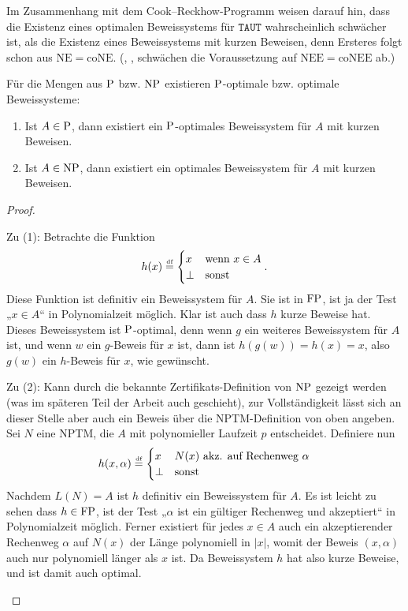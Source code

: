 Im Zusammenhang mit dem Cook–Reckhow-Programm weisen \textcite{krajicek_propositional_1989} darauf hin, dass die Existenz eines optimalen Beweissystems für $\mathtt{TAUT}$ wahrscheinlich schwächer ist, als die Existenz eines Beweissystems mit kurzen Beweisen, denn Ersteres folgt schon aus $\mathrm{NE}=\mathrm{coNE}$. (\citeauthor{kobler_optimal_2003}, \citeyear{kobler_optimal_2003}, schwächen die Voraussetzung auf $\mathrm{NEE=coNEE}$ ab.)

Für die Mengen aus $\P$ bzw. $\NP$ existieren $\P$-optimale bzw. optimale Beweissysteme:
\begin{observation}\label{obs:np-short-ps}
    \begin{enumerate}
        \item Ist $A\in \P$, dann existiert ein $\P$-optimales Beweissystem für $A$ mit kurzen Beweisen.
        \item Ist $A\in \NP$, dann existiert ein optimales Beweissystem für $A$ mit kurzen Beweisen.
    \end{enumerate}
\end{observation}
\begin{proof}
\begin{prooflist}[label={}]
\item Zu (1): Betrachte die Funktion
    \[ h(x) \defeq \begin{cases} x & \text{wenn $x\in A$} \\ \bot & \text{sonst} \end{cases}. \]
    Diese Funktion ist definitiv ein Beweissystem für $A$. Sie ist in $\FP$, ist ja der Test „$x\in A$“ in Polynomialzeit möglich. Klar ist auch dass $h$ kurze Beweise hat. Dieses Beweissystem ist $\P$-optimal, denn wenn $g$ ein weiteres Beweissystem für $A$ ist, und wenn $w$ ein $g$-Beweis für $x$ ist, dann ist $h(g(w))=h(x)=x$, also $g(w)$ ein $h$-Beweis für $x$, wie gewünscht. 

\item Zu (2): Kann durch die bekannte Zertifikats-Definition von $\NP$ gezeigt werden (was im späteren Teil der Arbeit auch geschieht), zur Vollständigkeit lässt sich an dieser Stelle aber auch ein Beweis über die NPTM-Definition von oben angeben. Sei $N$ eine NPTM, die $A$ mit polynomieller Laufzeit $p$ entscheidet.
    Definiere nun
    \[ h(x, \alpha) \defeq \begin{cases} x & \text{$N(x)$ akz. auf Rechenweg $\alpha$} \\ \bot & \text{sonst} \end{cases} \]
    Nachdem $L(N)=A$ ist $h$ definitiv ein Beweissystem für $A$. Es ist leicht zu sehen dass $h\in\FP$, ist der Test „$\alpha$ ist ein gültiger Rechenweg und akzeptiert“ in Polynomialzeit möglich. Ferner existiert für jedes $x\in A$ auch ein akzeptierender Rechenweg $\alpha$ auf $N(x)$ der Länge polynomiell in $|x|$, womit der Beweis $(x, \alpha)$ auch nur polynomiell länger als $x$ ist. Da Beweissystem $h$ hat also kurze Beweise, und ist damit auch optimal.
\end{prooflist}
\end{proof}
